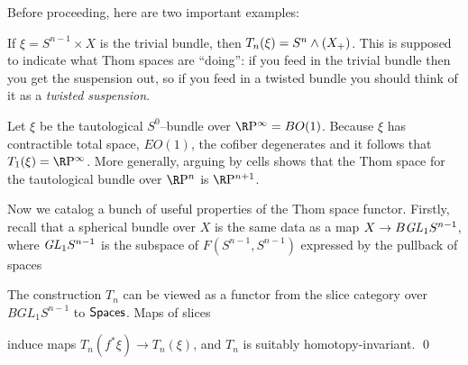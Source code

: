 Before proceeding, here are two important examples:
\begin{example}\label{TrivialBundleThomExample}
If $\xi = S^{n-1} \times X$ is the trivial bundle, then $T_n(\xi) = S^n \wedge (X_+)$.  This is supposed to indicate what Thom spaces are ``doing'': if you feed in the trivial bundle then you get the suspension out, so if you feed in a twisted bundle you should think of it as a \textit{twisted suspension}.
\end{example}

\begin{example}\label{RPnThomExample}
Let $\xi$ be the tautological $S^0$--bundle over $\RP^\infty = BO(1)$.  Because $\xi$ has contractible total space, $EO(1)$, the cofiber degenerates and it follows that $T_1(\xi) = \RP^\infty$. More generally, arguing by cells shows that the Thom space for the tautological bundle over $\RP^n$ is $\RP^{n+1}$.
\end{example}

Now we catalog a bunch of useful properties of the Thom space functor.  Firstly, recall that a spherical bundle over $X$ is the same data as a map $X \to B \mathit{GL}_1 S^{n-1}$, where $\mathit{GL}_1 S^{n-1}$ is the subspace of $F(S^{n-1}, S^{n-1})$ expressed by the pullback of spaces
\begin{center}
\end{center}

\begin{lemma}\label{ThomConstructionIsASliceFunctor}
The construction $T_n$ can be viewed as a functor from the slice category over $BGL_1 S^{n-1}$ to $\mathsf{Spaces}$.  Maps of slices
\begin{center}
\end{center}
induce maps $T_n(f^* \xi) \to T_n(\xi)$, and $T_n$ is suitably homotopy-invariant. \qed
\end{lemma}

